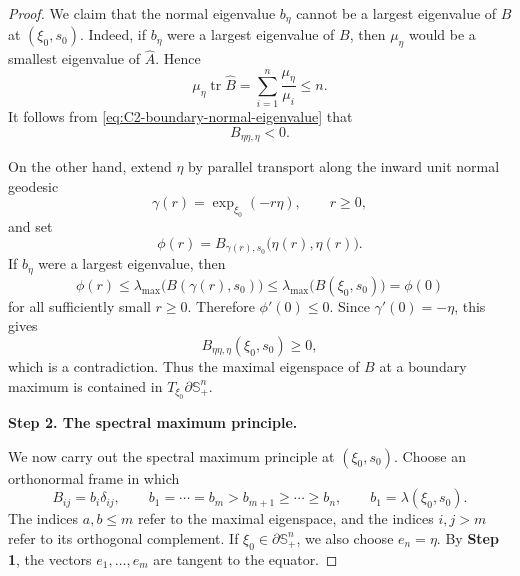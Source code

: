 \documentclass[11pt, reqno]{amsart}
\theoremstyle{remark}
\theoremstyle{definition}
\numberwithin{equation}{section}
\DeclareMathOperator{\tr}{tr}
\begin{document}
\begin{proof}
We claim that the normal eigenvalue $b_\eta$ cannot be a largest
eigenvalue of $B$ at $(\xi_0,s_0)$. Indeed, if $b_\eta$ were a
largest eigenvalue of $B$, then $\mu_\eta$ would be a smallest
eigenvalue of $\widehat A$. Hence
\begin{equation*}
        \mu_\eta\tr\widehat B
        =
        \sum_{i=1}^n\frac{\mu_\eta}{\mu_i}
        \leq n.
\end{equation*}
It follows from \eqref{eq:C2-boundary-normal-eigenvalue} that
\begin{equation*}
        B_{\eta\eta,\eta}<0.
\end{equation*}

On the other hand, extend $\eta$ by parallel transport along the
inward unit normal geodesic
\begin{equation*}
        \gamma(r)
        =
        \exp_{\xi_0}(-r\eta),
        \qquad r\geq0,
\end{equation*}
and set
\begin{equation*}
        \phi(r)
        =
        B_{\gamma(r),s_0}
        \big(\eta(r),\eta(r)\big).
\end{equation*}
If $b_\eta$ were a largest eigenvalue, then
\begin{equation*}
        \phi(r)
        \leq
        \lambda_{\max}
        \big(B(\gamma(r),s_0)\big)
        \leq
        \lambda_{\max}
        \big(B(\xi_0,s_0)\big)
        =
        \phi(0)
\end{equation*}
for all sufficiently small $r\geq0$. Therefore $\phi'(0)\leq0$.
Since $\gamma'(0)=-\eta$, this gives
\begin{equation*}
        B_{\eta\eta,\eta}(\xi_0,s_0)\geq0,
\end{equation*}
which is a contradiction. Thus the maximal eigenspace of $B$ at
a boundary maximum is contained in
$T_{\xi_0}\partial\mathbb S^n_+$.

\medskip
\noindent\textbf{Step 2. The spectral maximum principle.}

We now carry out the spectral maximum principle at
$(\xi_0,s_0)$. Choose an orthonormal frame in which
\begin{equation*}
        B_{ij}=b_i\delta_{ij},
        \qquad
        b_1=\cdots=b_m>b_{m+1}\geq\cdots\geq b_n,
        \qquad
        b_1=\lambda(\xi_0,s_0).
\end{equation*}
The indices $a,b\leq m$ refer to the maximal eigenspace, and the
indices $i,j>m$ refer to its orthogonal complement. If
$\xi_0\in\partial\mathbb S^n_+$, we also choose $ e_n=\eta$. 
By \textbf{Step 1}, the vectors $e_1,\ldots,e_m$ are tangent to the
equator.


\end{proof}
\end{document}
